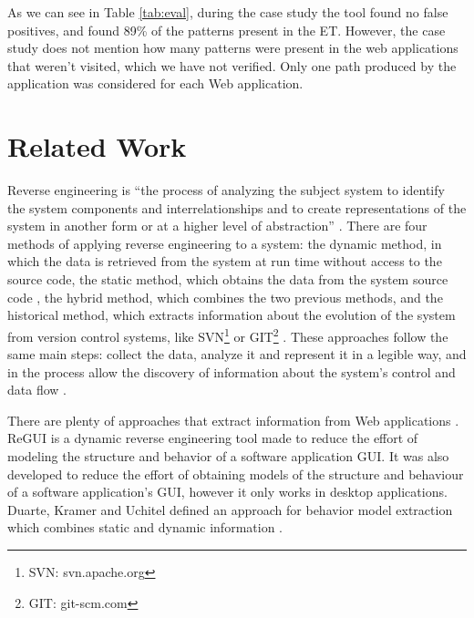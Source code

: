 \documentclass[conference]{IEEEtran}
\begin{document}
As we can see in Table \ref{tab:eval}, during the case study the tool found no false positives, and found 89\% of the  patterns present in the ET. However, the case study does not mention how many patterns were present in the web applications that weren't visited, which we have not verified. Only one path produced by the application was considered for each Web application.

\section{Related Work}\label{sec:sota}

Reverse engineering is ``the process of analyzing the subject system to identify the system components and interrelationships and to create representations of the system in another form or at a higher level of abstraction'' \cite{chikofsky1990reverse}. There are four methods of applying reverse engineering to a system: the dynamic method, in which the data is retrieved from the system at run time without access to the source code, the static method, which obtains the data from the system source code \cite{systa1999dynamic}, the hybrid method, which combines the two previous methods, and the historical method, which extracts information about the evolution of the system
from version control systems, like SVN\footnote{SVN: svn.apache.org} or GIT\footnote{GIT: git-scm.com} \cite{canfora2011achievements}. These approaches follow the same main steps: collect the data, analyze it and represent it in a legible way, and in the process allow the discovery of information about the system's control and data flow \cite{pacione2003comparative}.

There are plenty of approaches that extract information from Web applications \cite{sampath2007applying,amalfitano2010rich, andjelkovic2011trace}. ReGUI \cite{coimbra2011reverse,coimbra2012dynamic} is a dynamic reverse engineering tool made to reduce the effort of modeling the structure and behavior of a software application GUI. It was also developed to reduce the effort of obtaining models of the structure and behaviour of a software
application's GUI, however it only works in desktop applications.
Duarte, Kramer and Uchitel defined an approach for behavior model extraction which combines static and dynamic information \cite{duarte2006model}.
\end{document}
